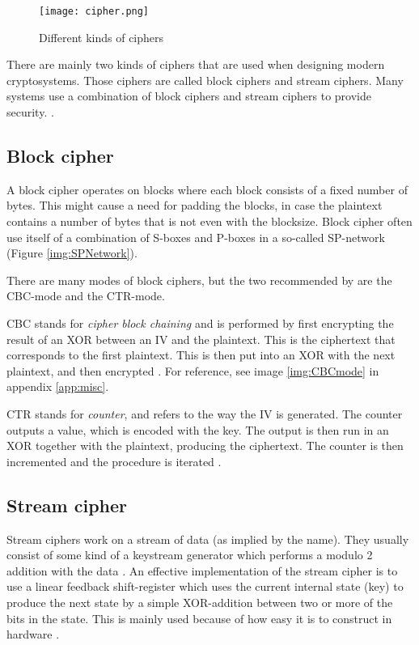 \begin{figure}
  \texttt{[image: cipher.png]}
  \caption{Different kinds of ciphers \citep{CipherTax:2013}}
  \label{img:ciphers}
\end{figure}

There are mainly two kinds of ciphers that are used when designing modern 
cryptosystems. Those ciphers are called block ciphers and stream ciphers. 
Many systems use a combination of block ciphers and stream ciphers to provide 
security. 
.

\subsection{Block cipher}\label{sec:BlockCipher}
A block cipher operates on blocks where each block consists of a fixed number 
of bytes. This might cause a need for padding the blocks, in case the plaintext 
contains a number of bytes that is not even with the blocksize. Block cipher 
often use itself of a combination of S-boxes and P-boxes in a so-called 
SP-network (Figure \ref{img:SPNetwork}).

There are many modes of block ciphers, but the two recommended by 
\citet{Schneier:2003} are the CBC-mode and the CTR-mode.

CBC stands for \emph{cipher block chaining} and is performed by first encrypting 
the result of an XOR between an IV and the plaintext. This is the ciphertext 
that corresponds to the first plaintext. This is then put into an XOR with the 
next plaintext, and then encrypted \citep[pp. 109--111]{Stinson:2006}. For 
reference, see image \ref{img:CBCmode} in appendix \ref{app:misc}.

CTR stands for \emph{counter}, and refers to the way the IV is generated. The
counter outputs a value, which is encoded with the key. The output is then run 
in an XOR together with the plaintext, producing the ciphertext. The counter is 
then incremented and the procedure is iterated \citep[p. 111]{Stinson:2006}.

\subsection{Stream cipher} \label{sec:StreamCipher}
Stream ciphers work on a stream of data (as implied by the name). They usually 
consist of some kind of a keystream generator which performs a modulo 2 addition
with the data \cite[pp. 67]{Simmons:1992}. An effective implementation of the 
stream cipher is to use a linear feedback shift-register which uses the current 
internal state (key) to produce the next state by a simple XOR-addition between 
two or more of the bits in the state. This is mainly used because of how easy
it is to construct in hardware \citep{LFSR:2008}.

